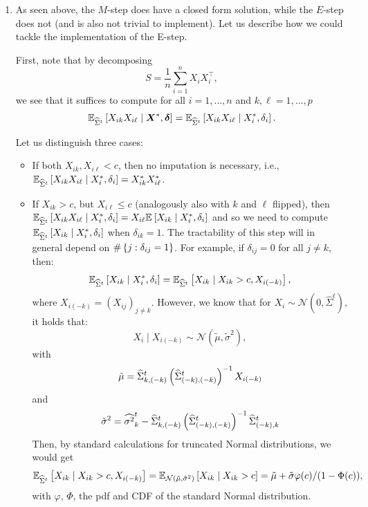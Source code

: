 \begin{enumerate}[label=(\alph*)]
\item As seen above, the $M$-step does have a closed form solution, while the $E$-step does not (and is also not trivial to implement). Let us describe how we could tackle the implementation of the E-step.

First, note that by decomposing 
$$S=\frac{1}{n}\sum_{i=1}^n X_i X_i^\top,$$ 
we see that it suffices to compute for all $i=1,\dotsc,n$ and $k,\ell = 1,\dotsc,p$
$$ \EE[\widehat{\Sigma}^t]{X_{ik}X_{i\ell} \mid \boldX^*, \bolddelta} = \EE[\widehat{\Sigma}^t]{X_{ik} X_{i\ell}\mid X^*_i, \delta_i}.$$

Let us distinguish three cases:
\begin{itemize}
\item If both $X_{ik},  X_{i \ell} < c$, then no imputation is necessary, i.e., $\EE[\widehat{\Sigma}^t]{X_{ik} X_{i \ell} \mid X^*_i, \delta_i} = X_{ik}^* X_{i\ell}^*$.
\item If $X_{ik} > c$, but $X_{i \ell} \leq c$ (analogously also with $k$ and $\ell$ flipped), then $\EE[\widehat{\Sigma}^t]{X_{ik} X_{i \ell} \mid X^*_i, \delta_i} = X_{i \ell} \EE{X_{ik} \mid X^*_i, \delta_i}$ and so we need to compute  $\EE[\widehat{\Sigma}^t]{X_{ik} \mid X^*_i, \delta_i}$ when $\delta_{ik}=1$. The tractability of this step will in general depend on $\#\cb{j:\delta_{ij}=1}$. For example, if $\delta_{ij} =0$ for all $j \neq k$, then:
$$\EE[\widehat{\Sigma}^t]{X_{ik} \mid X^*_i, \delta_i} = \EE[\widehat{\Sigma}^t]{ X_{ik} \mid  X_{ik}>c, X_{i(-k)}},$$
where $X_{i(-k)} = (X_{ij})_{j \neq k}$. However, we know that for $X_i \sim \mathcal{N}(0, \widehat{\Sigma}^t)$, it holds that:
$$ X_i \mid X_{i(-k)} \sim \mathcal{N}(\tilde{\mu}, \tilde{\sigma}^2),$$ 
with
$$\tilde{\mu} = \widehat{\Sigma}_{k,(-k)}^t \p{\widehat{\Sigma}_{(-k),(-k)}^t}^{-1} X_{i(-k)}$$
and
$$\tilde{\sigma}^2 = \widehat{\sigma^2}^t_k -  \widehat{\Sigma}_{k,(-k)}^t \p{\widehat{\Sigma}_{(-k),(-k)}^t}^{-1}\widehat{\Sigma}_{(-k),k}^t$$
Then, by standard calculations for truncated Normal distributions, we would get
$$\EE[\widehat{\Sigma}^t]{ X_{ik} \mid  X_{ik}>c, X_{i(-k)}} = \EE[\mathcal{N}\p{\tilde{\mu}, \tilde{\sigma}^2}]{X_{ik} \mid X_{ik} >c } = \tilde{\mu} + \tilde{\sigma}\varphi(c)/(1-\Phi(c)),$$
with $\varphi$, $\Phi$, the pdf and CDF of the standard Normal distribution.


\end{itemize}
\end{enumerate}
